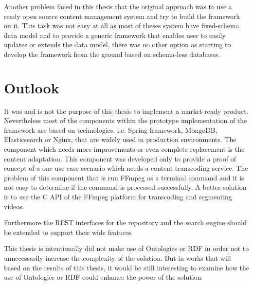 Another problem faced in this thesis that the original approach was to use a ready open source content management system and try to build the framework on it. This task was not easy at all as most of theses system have fixed-schema data model and to provide a generic framework that enables user to easily updates or extends the data model, there was no other option as starting to develop the framework from the ground based on schema-less databases. 

\section{Outlook}
It was and is not the purpose of this thesis to implement a market-ready product. Nevertheless most of the components within the prototype implementation of the framework are based on technologies, i.e. Spring framework, MongoDB, Elasticsearch or Nginx, that are widely used in production environments. The component which needs more improvements or even complete replacement is the content adaptation. This component was developed only to provide a proof of concept of a one use case scenario which needs a content transcoding service. The problem of this component that is run FFmpeg as a terminal command and it is not easy to determine if the command is processed successfully. A better solution is to use the C API of the FFmpeg platform for transcoding and segmenting videos.

Furthermore the REST interfaces for the repository and the search engine should be extended to support their wide features.

This thesis is intentionally did not make use of Ontologies or RDF in order not to unnecessarily increase the complexity of the solution. But in works that will based on the results of this thesis, it would be still interesting to examine how the use of Ontologies or RDF could enhance the power of the solution.